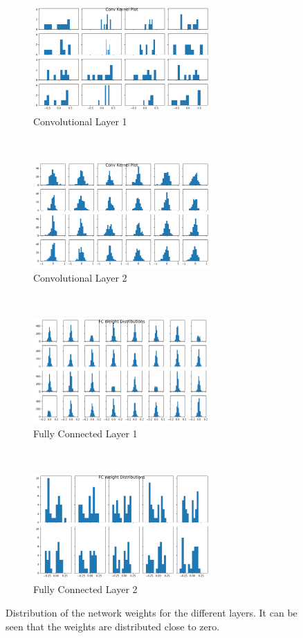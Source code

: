 \begin{figure}[htbp]
    \centering
    \begin{subfigure}[t]{0.5\textwidth}
        \centering
        \includegraphics[height=1.6in]{../../net/images/hist_cn1_k}
        \caption{Convolutional Layer 1}
    \end{subfigure}%
    ~ 
    \begin{subfigure}[t]{0.5\textwidth}
        \centering
         \includegraphics[height=1.6in]{../../net/images/hist_cn2_k}
        \caption{Convolutional Layer 2}
    \end{subfigure}%
    \\
    \begin{subfigure}[t]{0.5\textwidth}
        \centering
        \includegraphics[height=1.6in]{../../net/images/hist_fc1_w}
        \caption{Fully Connected Layer 1}
    \end{subfigure}%
    ~ 
    \begin{subfigure}[t]{0.5\textwidth}
        \centering
         \includegraphics[height=1.6in]{../../net/images/hist_fc2_w}
        \caption{Fully Connected Layer 2}
    \end{subfigure}
    \caption[Distribution of the network weights for the different layers]{Distribution of the network weights for the different layers. It can be seen that the weights are distributed close to zero.}
    \label{fig:network-weight-distributions}
\end{figure}


